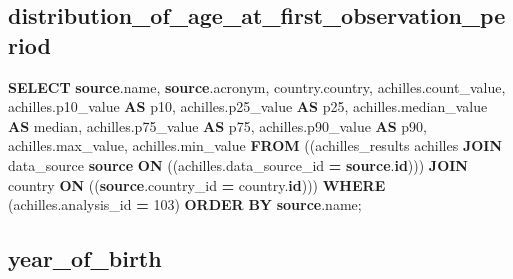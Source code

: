 \documentclass[
]{book}
\newenvironment{Shaded}{\begin{snugshade}}{\end{snugshade}}
\newcommand{\DecValTok}[1]{\textcolor[rgb]{0.00,0.00,0.81}{#1}}
\newcommand{\FunctionTok}[1]{\textcolor[rgb]{0.00,0.00,0.00}{#1}}
\newcommand{\KeywordTok}[1]{\textcolor[rgb]{0.13,0.29,0.53}{\textbf{#1}}}
\newcommand{\NormalTok}[1]{#1}
\newcommand{\OperatorTok}[1]{\textcolor[rgb]{0.81,0.36,0.00}{\textbf{#1}}}
\begin{document}
\hypertarget{distribution_of_age_at_first_observation_period}{%
\subsection*{distribution\_of\_age\_at\_first\_observation\_period}\label{distribution_of_age_at_first_observation_period}}

\begin{Shaded}
\begin{Highlighting}[]
\KeywordTok{SELECT} \KeywordTok{source}\NormalTok{.name,}
   \KeywordTok{source}\NormalTok{.acronym,}
\NormalTok{   country.country,}
\NormalTok{   achilles.count\_value,}
\NormalTok{   achilles.p10\_value }\KeywordTok{AS}\NormalTok{ p10,}
\NormalTok{   achilles.p25\_value }\KeywordTok{AS}\NormalTok{ p25,}
\NormalTok{   achilles.median\_value }\KeywordTok{AS} \FunctionTok{median}\NormalTok{,}
\NormalTok{   achilles.p75\_value }\KeywordTok{AS}\NormalTok{ p75,}
\NormalTok{   achilles.p90\_value }\KeywordTok{AS}\NormalTok{ p90,}
\NormalTok{   achilles.max\_value,}
\NormalTok{   achilles.min\_value}
  \KeywordTok{FROM}\NormalTok{ ((achilles\_results achilles}
    \KeywordTok{JOIN}\NormalTok{ data\_source }\KeywordTok{source} \KeywordTok{ON}\NormalTok{ ((achilles.data\_source\_id }\OperatorTok{=} \KeywordTok{source}\NormalTok{.}\KeywordTok{id}\NormalTok{)))}
    \KeywordTok{JOIN}\NormalTok{ country }\KeywordTok{ON}\NormalTok{ ((}\KeywordTok{source}\NormalTok{.country\_id }\OperatorTok{=}\NormalTok{ country.}\KeywordTok{id}\NormalTok{)))}
 \KeywordTok{WHERE}\NormalTok{ (achilles.analysis\_id }\OperatorTok{=} \DecValTok{103}\NormalTok{)}
 \KeywordTok{ORDER} \KeywordTok{BY} \KeywordTok{source}\NormalTok{.name;}
\end{Highlighting}
\end{Shaded}

\hypertarget{year_of_birth}{%
\subsection*{year\_of\_birth}\label{year_of_birth}}
\end{document}

